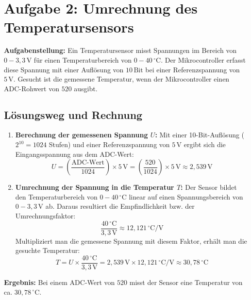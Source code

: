 \documentclass[a4paper,oneside,10pt]{article}%
\begin{document}
\section{Aufgabe 2: Umrechnung des Temperatursensors}

\textbf{Aufgabenstellung:}
Ein Temperatursensor misst Spannungen im Bereich von $0 - 3{,}3\,\text{V}$ für einen Temperaturbereich von $0 - 40\,^{\circ}\text{C}$. Der Mikrocontroller erfasst diese Spannung mit einer Auflösung von $10\,\text{Bit}$ bei einer Referenzspannung von $5\,\text{V}$. Gesucht ist die gemessene Temperatur, wenn der Mikrocontroller einen ADC-Rohwert von $520$ ausgibt.

\subsection{Lösungsweg und Rechnung}

\begin{enumerate}
    \item \textbf{Berechnung der gemessenen Spannung $U$:}
    Mit einer 10-Bit-Auflösung ($2^{10} = 1024$ Stufen) und einer Referenzspannung von $5\,\text{V}$ ergibt sich die Eingangsspannung aus dem ADC-Wert:
    \begin{equation}
        U = \left( \frac{\text{ADC-Wert}}{1024} \right) \times 5\,\text{V} = \left( \frac{520}{1024} \right) \times 5\,\text{V} \approx 2{,}539\,\text{V}
    \end{equation}

    \item \textbf{Umrechnung der Spannung in die Temperatur $T$:}
    Der Sensor bildet den Temperaturbereich von $0 - 40\,^{\circ}\text{C}$ linear auf einen Spannungsbereich von $0 - 3{,}3\,\text{V}$ ab. Daraus resultiert die Empfindlichkeit bzw. der Umrechnungsfaktor:
    \begin{equation}
        \frac{40\,^{\circ}\text{C}}{3{,}3\,\text{V}} \approx 12{,}121\,^{\circ}\text{C/V}
    \end{equation}
    Multipliziert man die gemessene Spannung mit diesem Faktor, erhält man die gesuchte Temperatur:
    \begin{equation}
        T = U \times \frac{40\,^{\circ}\text{C}}{3{,}3\,\text{V}} = 2{,}539\,\text{V} \times 12{,}121\,^{\circ}\text{C/V} \approx 30{,}78\,^{\circ}\text{C}
    \end{equation}
\end{enumerate}

\textbf{Ergebnis:} Bei einem ADC-Wert von $520$ misst der Sensor eine Temperatur von ca. \textbf{$30{,}78\,^{\circ}\text{C}$}.
\end{document}
